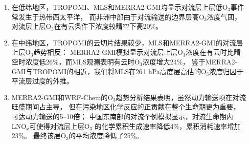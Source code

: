 \begin{enumerate}[label=（\arabic*）, labelindent=\parindent, leftmargin=0pt, widest=0, itemindent=*, topsep=0pt, partopsep=0pt, parsep=0pt]

\item 在低纬地区，TROPOMI、MLS和MERRA2-GMI均显示对流层上层低O$_3$事件常发生于热带西太平洋，
而非洲中部由于对流输送的边界层高O$_3$浓度气团，对流层上层O$_3$在有云条件下浓度较晴空下高20\%。

\item 在中纬地区，TROPOMI的云切片结果较少，MLS和MERRA2-GMI的对流层上层O$_3$趋势相反：
MERRA2-GMI模拟显示对流层上层O$_3$浓度在有云时比晴空时浓度低26\%，而MLS观测表明有云时O$_3$浓度增大24\%，
鉴于MERRA2-GMI与TROPOMI的相近，我们将MLS在261 hPa高度层高估的O$_3$浓度归因于平流层过度的外推。



\item MERRA2-GMI和WRF-Chem的O$_3$趋势分析结果表明，虽然动力输送项在对流旺盛期间占主导，
但在污染地区化学反应的正贡献在整个生命期更为重要，可达动力输送的5--10倍；
中国东南部的对流个例模拟显示，对流生命期内LNO$_x$可使得对流层上层O$_3$
的化学累积生成速率降低4\%，累积消耗速率增加23\%。
最终该层O$_3$的平均浓度降低了25\%。

\end{enumerate}
